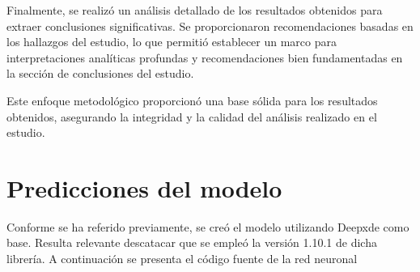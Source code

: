 \documentclass[
  spanish,
  us-letterpaper,
  DIV=11,
  numbers=noendperiod]{scrreprt}
\theoremstyle{definition}
\theoremstyle{plain}
\theoremstyle{remark}
\begin{document}
Finalmente, se realizó un análisis detallado de los resultados obtenidos
para extraer conclusiones significativas. Se proporcionaron
recomendaciones basadas en los hallazgos del estudio, lo que permitió
establecer un marco para interpretaciones analíticas profundas y
recomendaciones bien fundamentadas en la sección de conclusiones del
estudio.

Este enfoque metodológico proporcionó una base sólida para los
resultados obtenidos, asegurando la integridad y la calidad del análisis
realizado en el estudio.

\chapter{Predicciones del modelo}\label{predicciones-del-modelo}

Conforme se ha referido previamente, se creó el modelo utilizando
Deepxde como base. Resulta relevante descatacar que se empleó la versión
1.10.1 de dicha librería. A continuación se presenta el código fuente de
la red neuronal
\end{document}
